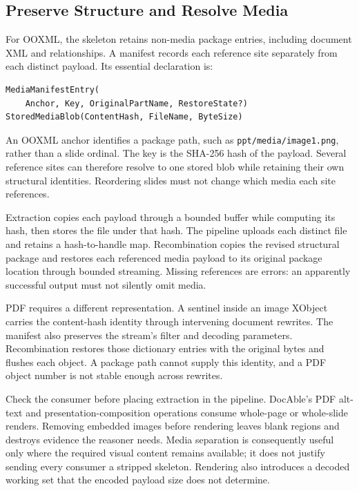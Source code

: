 \subsection*{Preserve Structure and Resolve Media}

For OOXML, the skeleton retains non-media package entries, including document XML and relationships. A manifest records each reference site separately from each distinct payload. Its essential declaration is:

\begin{verbatim}
MediaManifestEntry(
    Anchor, Key, OriginalPartName, RestoreState?)
StoredMediaBlob(ContentHash, FileName, ByteSize)
\end{verbatim}

An OOXML anchor identifies a package path, such as \texttt{ppt/media/image1.png}, rather than a slide ordinal. The key is the SHA-256 hash of the payload. Several reference sites can therefore resolve to one stored blob while retaining their own structural identities. Reordering slides must not change which media each site references.

Extraction copies each payload through a bounded buffer while computing its hash, then stores the file under that hash. The pipeline uploads each distinct file and retains a hash-to-handle map. Recombination copies the revised structural package and restores each referenced media payload to its original package location through bounded streaming. Missing references are errors: an apparently successful output must not silently omit media.

PDF requires a different representation. A sentinel inside an image XObject carries the content-hash identity through intervening document rewrites. The manifest also preserves the stream's filter and decoding parameters. Recombination restores those dictionary entries with the original bytes and flushes each object. A package path cannot supply this identity, and a PDF object number is not stable enough across rewrites.

Check the consumer before placing extraction in the pipeline. DocAble's PDF alt-text and presentation-composition operations consume whole-page or whole-slide renders. Removing embedded images before rendering leaves blank regions and destroys evidence the reasoner needs. Media separation is consequently useful only where the required visual content remains available; it does not justify sending every consumer a stripped skeleton. Rendering also introduces a decoded working set that the encoded payload size does not determine.

